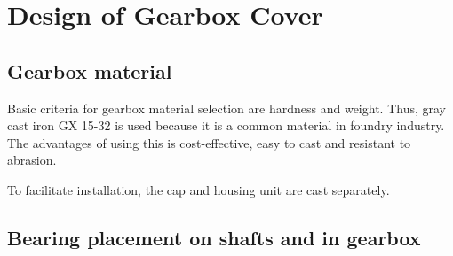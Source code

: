 \chapter{Design of Gearbox Cover}
\section{Gearbox material}
Basic criteria for gearbox material selection are hardness and weight. Thus, gray cast iron GX 15-32 is used because it is a common material in foundry industry. The advantages of using this is cost-effective, easy to cast and resistant to abrasion.

To facilitate installation, the cap and housing unit are cast separately.

\section{Bearing placement on shafts and in gearbox}

